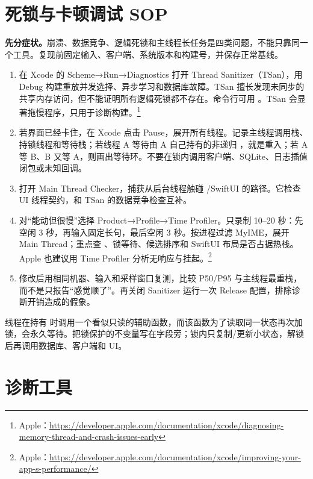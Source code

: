 \section{死锁与卡顿调试 SOP}

\textbf{先分症状。}崩溃、数据竞争、逻辑死锁和主线程长任务是四类问题，不能只靠同一个工具。复现前固定输入、客户端、系统版本和构建号，并保存正常基线。

\begin{enumerate}
  \item 在 Xcode 的 Scheme→Run→Diagnostics 打开 Thread Sanitizer（TSan），用 Debug 构建重放并发选择、异步学习和数据库故障。TSan 擅长发现未同步的共享内存访问，但不能证明所有逻辑死锁都不存在。命令行可用 。TSan 会显著拖慢程序，只用于诊断构建。\footnote{Apple：\url{https://developer.apple.com/documentation/xcode/diagnosing-memory-thread-and-crash-issues-early}}
  \item 若界面已经卡住，在 Xcode 点击 Pause，展开所有线程。记录主线程调用栈、持锁线程和等待栈；若线程 A 等待由 A 自己持有的非递归 ，就是重入；若 A 等 B、B 又等 A，则画出等待环。不要在锁内调用客户端、SQLite、日志插值闭包或未知回调。
  \item 打开 Main Thread Checker，捕获从后台线程触碰 /SwiftUI 的路径。它检查 UI 线程契约，和 TSan 的数据竞争检查互补。
  \item 对“能动但很慢”选择 Product→Profile→Time Profiler。只录制 10--20 秒：先空闲 3 秒，再输入固定长句，最后空闲 3 秒。按进程过滤 MyIME，展开 Main Thread；重点查 、锁等待、候选排序和 SwiftUI 布局是否占据热栈。Apple 也建议用 Time Profiler 分析无响应与挂起。\footnote{Apple：\url{https://developer.apple.com/documentation/xcode/improving-your-app-s-performance/}}
  \item 修改后用相同机器、输入和采样窗口复测，比较 P50/P95 与主线程最重栈，而不是只报告“感觉顺了”。再关闭 Sanitizer 运行一次 Release 配置，排除诊断开销造成的假象。
\end{enumerate}

\begin{warningbox}
线程在持有  时调用一个看似只读的辅助函数，而该函数为了读取同一状态再次加锁，会永久等待。把锁保护的不变量写在字段旁；锁内只复制/更新小状态，解锁后再调用数据库、客户端和 UI。
\end{warningbox}

\section{诊断工具}

